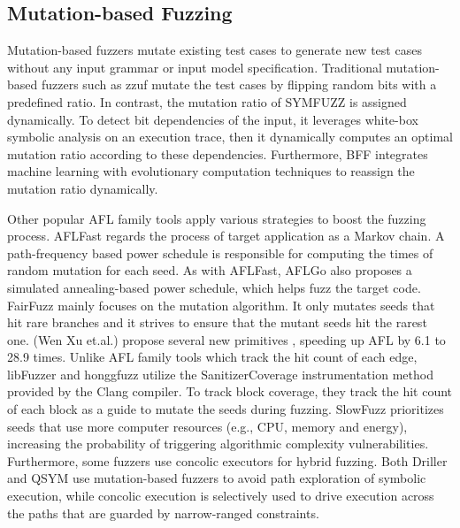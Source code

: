 \subsection{Mutation-based Fuzzing}
Mutation-based fuzzers \cite{zzuf,symfuzz,bff} mutate existing test cases to generate new test cases without any input grammar or input model specification.
Traditional mutation-based fuzzers such as zzuf \cite{zzuf} mutate the test cases by flipping random bits with a predefined ratio.
In contrast, the mutation ratio of SYMFUZZ \cite{symfuzz} is assigned dynamically. To detect bit dependencies of the input,
it leverages white-box symbolic analysis on an execution trace, then it dynamically computes an optimal mutation ratio according to these dependencies. Furthermore, BFF \cite{bff} integrates machine learning with evolutionary computation techniques to reassign the mutation ratio dynamically. 

Other popular AFL family tools \cite{afl,aflfast,aflgo,FairFuzz} apply various strategies to boost the fuzzing process. AFLFast \cite{aflfast} regards the process of target application as a Markov chain. A path-frequency based power schedule is responsible for computing the times of random mutation for each seed.
As with AFLFast, AFLGo \cite{aflgo} also proposes a simulated annealing-based power schedule, which helps fuzz the target code. %
FairFuzz \cite{FairFuzz} mainly focuses on the mutation algorithm. It only mutates seeds that hit rare branches and it strives to ensure that the mutant seeds hit the rarest one.
(Wen Xu et.al.)\cite{xu2017designing} propose several new primitives ,
speeding up AFL by 6.1 to 28.9 times.
Unlike AFL family tools which track the hit count of each edge, libFuzzer \cite{libFuzzer} and honggfuzz \cite{Honggfuzz} utilize the SanitizerCoverage instrumentation method provided by the Clang compiler. To track block coverage, they track the hit count of each block as a guide to mutate the seeds during fuzzing.
SlowFuzz \cite{petsios2017slowfuzz} prioritizes seeds
that use more computer resources (e.g., CPU, memory and energy), increasing the probability of triggering algorithmic complexity
vulnerabilities. Furthermore, some fuzzers use concolic executors for hybrid fuzzing. Both Driller \cite{driller} and QSYM use mutation-based fuzzers to avoid path exploration of symbolic execution, while concolic execution is selectively used to drive execution across the paths that are guarded by narrow-ranged constraints.




